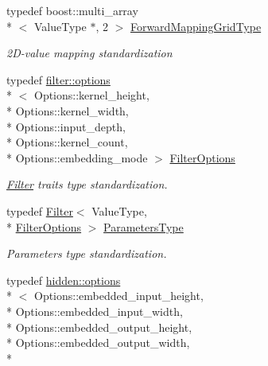 \begin{DoxyCompactItemize}
\item 
typedef boost\-::multi\-\_\-array\\*
$<$ Value\-Type $\ast$, 2 $>$ \hyperlink{structffnn_1_1layer_1_1convolution_1_1extrinsics_ac75346616a5d8766c52ccf663bd97170}{Forward\-Mapping\-Grid\-Type}
\begin{DoxyCompactList}\small\item\em 2\-D-\/value mapping standardization \end{DoxyCompactList}\item 
typedef \hyperlink{structffnn_1_1layer_1_1convolution_1_1filter_1_1options}{filter\-::options}\\*
$<$ Options\-::kernel\-\_\-height, \\*
Options\-::kernel\-\_\-width, \\*
Options\-::input\-\_\-depth, \\*
Options\-::kernel\-\_\-count, \\*
Options\-::embedding\-\_\-mode $>$ \hyperlink{structffnn_1_1layer_1_1convolution_1_1extrinsics_a0de5368aa5d42881cfd7406cc2762bc5}{Filter\-Options}
\begin{DoxyCompactList}\small\item\em \hyperlink{classffnn_1_1layer_1_1convolution_1_1_filter}{Filter} traits type standardization. \end{DoxyCompactList}\item 
typedef \hyperlink{classffnn_1_1layer_1_1convolution_1_1_filter}{Filter}$<$ Value\-Type, \\*
\hyperlink{structffnn_1_1layer_1_1convolution_1_1extrinsics_a0de5368aa5d42881cfd7406cc2762bc5}{Filter\-Options} $>$ \hyperlink{structffnn_1_1layer_1_1convolution_1_1extrinsics_a7f09ed7d5f347efd854649ac8ac22e21}{Parameters\-Type}
\begin{DoxyCompactList}\small\item\em Parameters type standardization. \end{DoxyCompactList}\item 
typedef \hyperlink{structffnn_1_1layer_1_1hidden_1_1options}{hidden\-::options}\\*
$<$ Options\-::embedded\-\_\-input\-\_\-height, \\*
Options\-::embedded\-\_\-input\-\_\-width, \\*
Options\-::embedded\-\_\-output\-\_\-height, \\*
Options\-::embedded\-\_\-output\-\_\-width, \\*

\end{DoxyCompactItemize}
